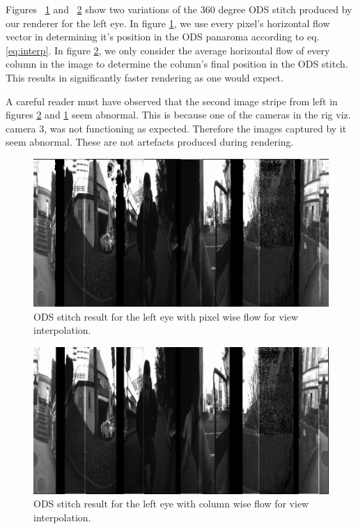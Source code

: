 \documentclass[10pt,twocolumn,letterpaper]{article}
\begin{document}
Figures  ~\ref{fig:lefteye_pwise} and ~\ref{fig:lefteye_cwise} show two variations of the 360 degree ODS stitch produced by our renderer for the left eye. In figure \ref{fig:lefteye_pwise}, we use every pixel's horizontal flow vector in determining it's position in the ODS panaroma according to eq. \ref{eq:interp}. In figure \ref{fig:lefteye_cwise}, we only consider the average horizontal flow of every column in the image to determine the column's final position in the ODS stitch. This results in significantly faster rendering as one would expect. 

A careful reader must have observed that the second image stripe from left in figures \ref{fig:lefteye_cwise} and \ref{fig:lefteye_pwise} seem abnormal. This is because one of the cameras in the rig viz. camera 3, was not functioning as expected. Therefore the images captured by it seem abnormal. These are not artefacts produced during rendering. 
 
\begin{figure}[t]
\begin{center}
   \includegraphics[width=\linewidth]{../results/ODS-renderer-results/frame0_lefteye_pwise.png}
\end{center}
   \caption{ODS stitch result for the left eye with pixel wise flow for view interpolation.}
\label{fig:lefteye_pwise}
\end{figure}

\begin{figure}[t]
\begin{center}
   \includegraphics[width=\linewidth]{../results/ODS-renderer-results/frame0_lefteye_cwise.png}
\end{center}
   \caption{ODS stitch result for the left eye with column wise flow for view interpolation.}
\label{fig:lefteye_cwise}
\end{figure}
\end{document}
